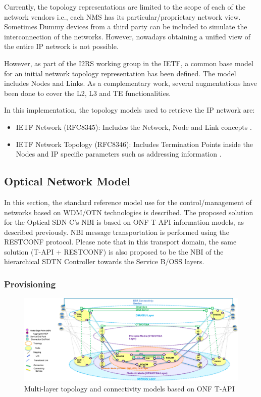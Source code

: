 \documentclass[a4paper,fleqn]{cas-dc}
\begin{document}
Currently, the topology representations are limited to the scope of each of the network vendors i.e., each NMS has its particular/proprietary network view. Sometimes Dummy devices from a third party can be included to simulate the interconnection of the networks. However, nowadays obtaining a unified view of the entire IP network is not possible.

However, as part of the I2RS working group in the IETF, a common base model for an initial network topology representation has been defined. The model includes Nodes and Links. As a complementary work, several augmentations have been done to cover the L2, L3 and TE functionalities.

In this implementation, the topology models used to retrieve the IP network are: 
\begin{itemize}
\item IETF Network (RFC8345): Includes the Network, Node and Link concepts \cite{clemm2018yang}.
\item IETF Network Topology (RFC8346): Includes Termination Points inside the Nodes and IP specific parameters such as addressing information \cite{varga2018internet}.
\end{itemize}

\subsection{Optical Network Model}
\label{section:OPTmodels}

In this section, the standard reference model use for the control/management of networks based on WDM/OTN technologies is described. The proposed solution for the Optical SDN-C's NBI is based on ONF T-API information models, as described previously.  NBI message transportation is performed using the RESTCONF protocol. Please note that in this transport domain, the same solution (T-API + RESTCONF) is also proposed to be the NBI of the hierarchical SDTN Controller towards the Service B/OSS layers.

\subsubsection{Provisioning}

\begin{figure}
	\centering
		\includegraphics[scale=0.8]{figs/ONF-T-API.png}
	\caption{Multi-layer topology and connectivity models based on ONF T-API}
	\label{FIG:ONF-T-API}
\end{figure}
\end{document}
